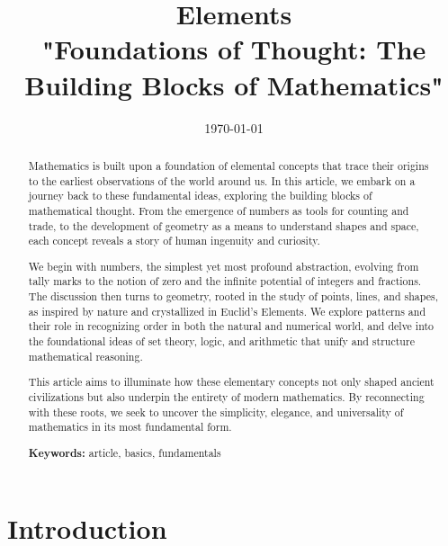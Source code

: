 \documentclass[a4paper]{article}
\title{Elements\\[1em] \large "Foundations of Thought: The Building Blocks of Mathematics"}
\date{
	\vspace{-2em}
	\today
}
\theoremstyle{plain}
\theoremstyle{definition}
\begin{document}
	\maketitle
	
	\begin{abstract}
		Mathematics is built upon a foundation of elemental concepts that trace their origins to the earliest observations of the world around us. In this article, we embark on a journey back to these fundamental ideas, exploring the 			building blocks of mathematical thought. From the emergence of numbers as tools for counting and trade, to the development of geometry as a means to understand shapes and space, each concept reveals a story of 			human ingenuity and curiosity.

		We begin with numbers, the simplest yet most profound abstraction, evolving from tally marks to the notion of zero and the infinite potential of integers and fractions. The discussion then turns to geometry, rooted in the study 		of points, lines, and shapes, as inspired by nature and crystallized in Euclid's Elements. We explore patterns and their role in recognizing order in both the natural and numerical world, and delve into the foundational ideas of 		set theory, logic, and arithmetic that unify and structure mathematical reasoning.
		
		This article aims to illuminate how these elementary concepts not only shaped ancient civilizations but also underpin the entirety of modern mathematics. By reconnecting with these roots, we seek to uncover the simplicity, 			elegance, and universality of mathematics in its most fundamental form.
		
		\noindent\textbf{Keywords:} article, basics, fundamentals
	\end{abstract}

	\tableofcontents
	
	\section{Introduction}
	\label{sec:intro}
	
	
	
	\appendix
	
\end{document}

